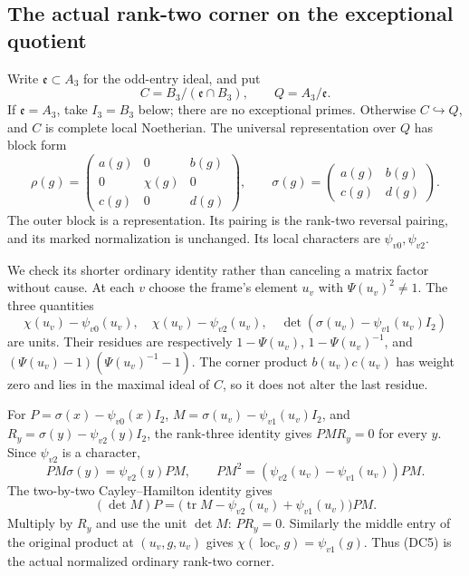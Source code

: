 \subsection{The actual rank-two corner on the exceptional quotient}
Write \(\mathfrak e\subset A_3\) for the
odd-entry ideal, and put
\[
 C=B_3/(\mathfrak e\cap B_3),\qquad
                 Q=A_3/\mathfrak e .
\]
If \(\mathfrak e=A_3\), take \(I_3=B_3\)
below; there are no exceptional primes.
Otherwise \(C\hookrightarrow Q\), and
\(C\) is complete local Noetherian.
The universal representation over \(Q\) has
block form
\[
 \rho(g)=
 \begin{pmatrix}
 a(g)&0&b(g)\\
 0&\chi(g)&0\\
 c(g)&0&d(g)
 \end{pmatrix},\qquad
       \sigma(g)=\begin{pmatrix}a(g)&b(g)\\c(g)&d(g)\end{pmatrix}.
                                                               \tag{DC5}
\]
The outer block is a representation.
Its pairing is the rank-two reversal pairing,
and its marked normalization is unchanged.
Its local characters are
\(\psi_{v0},\psi_{v2}\).

We check its shorter ordinary identity rather
than canceling a matrix factor without cause.
At each \(v\) choose the frame's element \(u_v\)
with \(\Psi(u_v)^2\ne1\).
The three quantities
\[
 \chi(u_v)-\psi_{v0}(u_v),\quad
 \chi(u_v)-\psi_{v2}(u_v),\quad
                   \det(\sigma(u_v)-\psi_{v1}(u_v)I_2)
\]
are units.
Their residues are respectively
\(1-\Psi(u_v)\), \(1-\Psi(u_v)^{-1}\),
and
\((\Psi(u_v)-1)(\Psi(u_v)^{-1}-1)\).
The corner product \(b(u_v)c(u_v)\) has
weight zero and lies in the maximal ideal
of \(C\), so it does not alter the last
residue.

For \(P=\sigma(x)-\psi_{v0}(x)I_2\),
\(M=\sigma(u_v)-\psi_{v1}(u_v)I_2\),
and \(R_y=\sigma(y)-\psi_{v2}(y)I_2\),
the rank-three identity gives \(PMR_y=0\)
for every \(y\).
Since \(\psi_{v2}\) is a character,
\[
 PM\sigma(y)=\psi_{v2}(y)PM,\qquad
 PM^2=(\psi_{v2}(u_v)-\psi_{v1}(u_v))PM.
\]
The two-by-two Cayley--Hamilton identity gives
\[
 (\det M)P=
  \bigl(\operatorname{tr}M
        -\psi_{v2}(u_v)+\psi_{v1}(u_v)\bigr)PM.
\]
Multiply by \(R_y\) and use the unit
\(\det M\): \(PR_y=0\).
Similarly the middle entry of the original
product at \((u_v,g,u_v)\) gives
\(\chi(\operatorname{loc}_v g)=\psi_{v1}(g)\).
Thus (DC5) is the actual normalized
ordinary rank-two corner.

